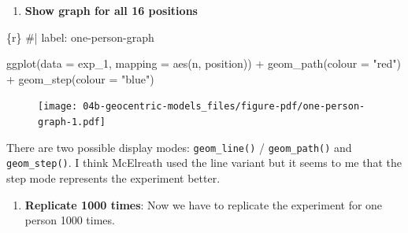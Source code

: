 \documentclass[
  letterpaper,
  DIV=11,
  numbers=noendperiod]{scrreprt}
\newenvironment{Shaded}{\begin{snugshade}}{\end{snugshade}}
\newcommand{\AttributeTok}[1]{\textcolor[rgb]{0.40,0.45,0.13}{#1}}
\newcommand{\CommentTok}[1]{\textcolor[rgb]{0.37,0.37,0.37}{#1}}
\newcommand{\FunctionTok}[1]{\textcolor[rgb]{0.28,0.35,0.67}{#1}}
\newcommand{\InformationTok}[1]{\textcolor[rgb]{0.37,0.37,0.37}{#1}}
\newcommand{\NormalTok}[1]{\textcolor[rgb]{0.00,0.23,0.31}{#1}}
\newcommand{\SpecialCharTok}[1]{\textcolor[rgb]{0.37,0.37,0.37}{#1}}
\newcommand{\StringTok}[1]{\textcolor[rgb]{0.13,0.47,0.30}{#1}}
\providecommand{\tightlist}{%
  \setlength{\itemsep}{0pt}\setlength{\parskip}{0pt}}\usepackage{longtable,booktabs,array}
\begin{document}
\begin{enumerate}
\def\labelenumi{\arabic{enumi}.}
\setcounter{enumi}{4}
\tightlist
\item
  \textbf{Show graph for all 16 positions}
\end{enumerate}

\begin{Shaded}
\begin{Highlighting}[]
\InformationTok{\textasciigrave{}\textasciigrave{}\textasciigrave{}\{r\}}
\CommentTok{\#| label: one{-}person{-}graph}

\FunctionTok{ggplot}\NormalTok{(}\AttributeTok{data =}\NormalTok{ exp\_1, }\AttributeTok{mapping =} \FunctionTok{aes}\NormalTok{(n, position)) }\SpecialCharTok{+}
    \FunctionTok{geom\_path}\NormalTok{(}\AttributeTok{colour =} \StringTok{"red"}\NormalTok{) }\SpecialCharTok{+}
    \FunctionTok{geom\_step}\NormalTok{(}\AttributeTok{colour =} \StringTok{"blue"}\NormalTok{)}
\InformationTok{\textasciigrave{}\textasciigrave{}\textasciigrave{}}
\end{Highlighting}
\end{Shaded}

\begin{figure}[H]

{\centering \texttt{[image: 04b-geocentric-models\_files/figure-pdf/one-person-graph-1.pdf]}

}

\end{figure}

There are two possible display modes: \texttt{geom\_line()} /
\texttt{geom\_path()} and \texttt{geom\_step()}. I think McElreath used
the line variant but it seems to me that the step mode represents the
experiment better.

\begin{enumerate}
\def\labelenumi{\arabic{enumi}.}
\setcounter{enumi}{5}
\tightlist
\item
  \textbf{Replicate 1000 times}: Now we have to replicate the experiment
  for one person 1000 times.
\end{enumerate}
\end{document}
